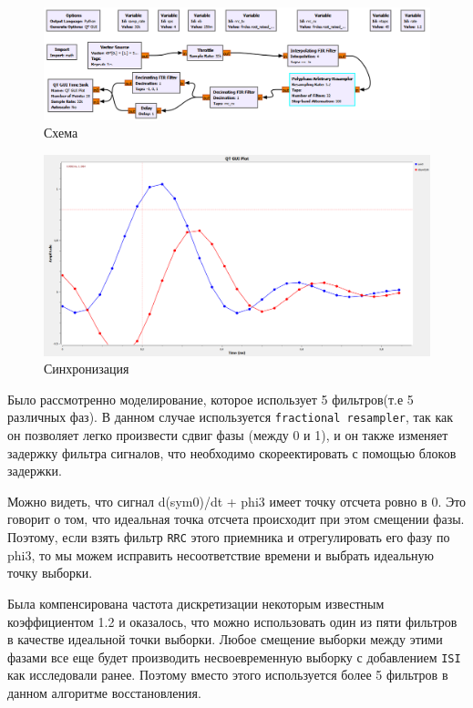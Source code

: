 \documentclass[a4paper]{article}
\begin{document}
            \begin{figure}[H]
                \centering
                \includegraphics[width=\textwidth]{ex_3_5.png}
                \caption{Схема}
                \label{fig:ex_3_5}
            \end{figure}
            
            \begin{figure}[H]
                \centering
                \includegraphics[width=\textwidth]{ex_3_6.png}
                \caption{Синхронизация}
                \label{fig:ex_3_6}
            \end{figure}
            
            Было рассмотренно моделирование, которое использует 5 фильтров(т.е 5 различных фаз). В данном случае используется \texttt{fractional resampler}, так как он позволяет легко произвести сдвиг фазы (между 0 и 1), и он также изменяет задержку фильтра сигналов, что необходимо скореектировать с помощью блоков задержки.
            
            Можно видеть, что сигнал d(sym0)/dt + phi3 имеет точку отсчета ровно в 0. Это говорит о том, что идеальная точка отсчета происходит при этом смещении фазы. Поэтому, если взять фильтр \texttt{RRC} этого приемника и отрегулировать его фазу по phi3, то мы можем исправить несоответствие времени и выбрать идеальную точку выборки.
            
            Была компенсирована частота дискретизации некоторым известным коэффициентом 1.2 и оказалось, что можно использовать один из пяти фильтров в качестве идеальной точки выборки. Любое смещение выборки между этими фазами все еще будет производить несвоевременную выборку с добавлением \texttt{ISI} как исследовали ранее. Поэтому вместо этого используется более 5 фильтров в данном алгоритме восстановления.
            
\end{document}
